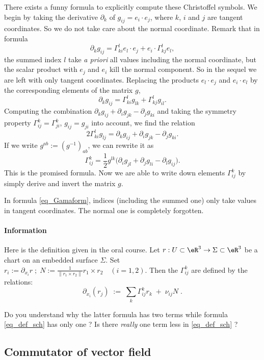  There exists a funny formula to explicitly compute these Christoffel symbols. We begin by taking the derivative $\partial_k$ of $g_{ij}=e_i\cdot e_j$, where $k$, $i$ and $j$ are tangent coordinates. So we do not take care about the normal coordinate. Remark that in formula
\[
\partial_kg_{ij}=\Gamma_{ki}^{l}e_l\cdot e_j+e_i\cdot\Gamma_{kj}^{l}e_l,
\]
the summed index $l$ take \emph{a priori} all values including the normal coordinate, but the scalar product with $e_j$ and $e_i$ kill the normal component. So in the sequel we are left with only tangent coordinates. Replacing the products $e_l\cdot e_j$ and $e_i\cdot e_l$ by the corresponding elements of the matrix $g$,
\[ 
  \partial_kg_{ij}=\Gamma_{ki}^{l}g_{lk}+\Gamma_{kj}^{l}g_{il}.
\]
Computing the combination $\partial_kg_{ij}+\partial_ig_{jk}-\partial_jg_{ki}$ and taking the symmetry property $\Gamma_{ij}^{k}=\Gamma_{ji}^{k}$, $g_{ij}=g_{ji}$ into account, we find the relation
\[ 
  2\Gamma_{ki}^{l}g_{lj}=\partial_kg_{ij}+\partial_ig_{jk}-\partial_jg_{ki}.
\]
If we write $g^{ab}:=(g^{-1})_{ab}$, we can rewrite it as
\begin{equation}  \label{eq_Gamaform}
\Gamma_{ij}^{k}=\frac{ 1 }{2}g^{lk}\big( \partial_ig_{jl}+\partial_jg_{li}-\partial_lg_{ij} \big).
\end{equation}
This is the promised formula. Now we are able to write down elements $\Gamma_{ij}^{k}$ by simply derive and invert the matrix $g$.

In formula \eqref{eq_Gamaform}, indices (including the summed one) only take values in tangent coordinates. The normal one is completely forgotten.


\paragraph{Information}

Here is the definition given in the oral course. Let $r:U\subset\eR^3\to\Sigma\subset\eR^3$ be a chart on an embedded surface $\Sigma$.
Set $r_i:=\partial_{x_i}r\;;\;N:=\frac{1}{\|r_1\times r_2\|}r_1\times r_2\quad(i=1,2)$. Then the 
$\Gamma_{ij}^k$ are defined by the relations:
\[
\partial_{x_i}(r_j)\;:=\;\sum_k\Gamma_{ij}^kr_k\;+\;\nu_{ij}N\;.
\]

Do  you understand why the latter formula has two terms while formula  \eqref{eq_def_sch} has only one ? Is there \emph{really} one term less in \eqref{eq_def_sch} ?

\subsection{Commutator of vector field}

